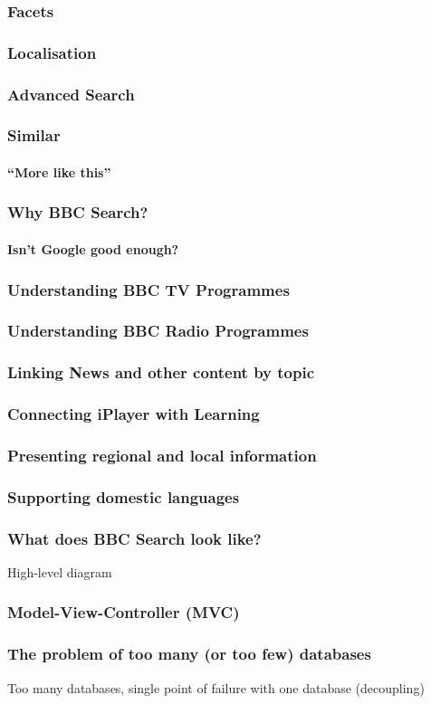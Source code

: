 \documentclass{beamer}
\begin{document}
\begin{frame}
  \frametitle{Facets}
\end{frame}

\begin{frame}
  \frametitle{Localisation}
\end{frame}

\begin{frame}
  \frametitle{Advanced Search}
\end{frame}

\begin{frame}
  \frametitle{Similar}
  \framesubtitle{``More like this''}
\end{frame}

\begin{frame}
  \frametitle{Why BBC Search?}
  \framesubtitle{Isn't Google good enough?}
\end{frame}

\begin{frame}
  \frametitle{Understanding BBC TV Programmes}
\end{frame}

\begin{frame}
  \frametitle{Understanding BBC Radio Programmes}
\end{frame}

\begin{frame}
  \frametitle{Linking News and other content by topic}
\end{frame}

\begin{frame}
  \frametitle{Connecting iPlayer with Learning}
\end{frame}

\begin{frame}
  \frametitle{Presenting regional and local information}
\end{frame}

\begin{frame}
  \frametitle{Supporting domestic languages}
\end{frame}

\begin{frame}
  \frametitle{What does BBC Search look like?}
  High-level diagram
\end{frame}

\begin{frame}
  \frametitle{Model-View-Controller (MVC)}
\end{frame}

\begin{frame}
  \frametitle{The problem of too many (or too few) databases}
  Too many databases, single point of failure with one database (decoupling)
\end{frame}
\end{document}
